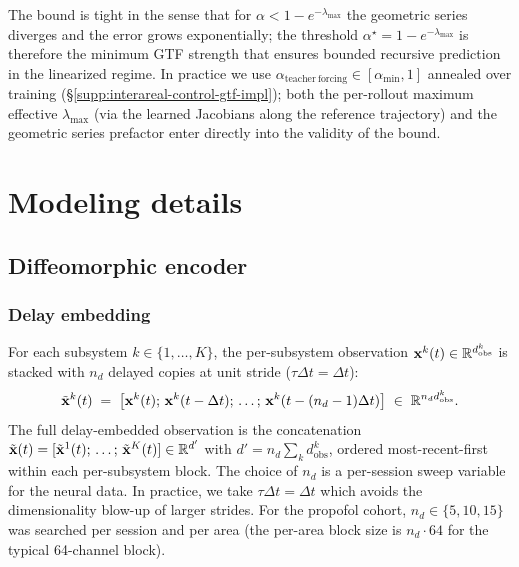\begin{remark}
The bound is tight in the sense that for $\alpha<1-e^{-\lambda_{\max}}$ the geometric series diverges and the error grows exponentially; the threshold $\alpha^{\star}=1-e^{-\lambda_{\max}}$ is therefore the minimum GTF strength that ensures bounded recursive prediction in the linearized regime. In practice we use $\alpha_{\mathrm{teacher\ forcing}}\in[\alpha_{\min},1]$ annealed over training (\S\ref{supp:interareal-control-gtf-impl}); both the per-rollout maximum effective $\lambda_{\max}$ (via the learned Jacobians along the reference trajectory) and the geometric series prefactor enter directly into the validity of the bound.
\end{remark}

\section{Modeling details}\label{supp:interareal-control-modeling}

\subsection{Diffeomorphic encoder}\label{supp:interareal-control-encoder-details}

\subsubsection{Delay embedding}\label{supp:interareal-control-delay-embed}

For each subsystem $k\in\{1,\ldots,K\}$, the per-subsystem observation $\vb{x}^{k}(t)\in\mathbb{R}^{d_{\mathrm{obs}}^{k}}$ is stacked with $n_{d}$ delayed copies at unit stride ($\tau\Delta t=\Delta t$):
\begin{equation}
\tilde{\vb{x}}^{k}(t) \;=\; \bigl[\vb{x}^{k}(t);\,\vb{x}^{k}(t-\Delta t);\,\ldots;\,\vb{x}^{k}(t-(n_{d}-1)\Delta t)\bigr] \;\in\; \mathbb{R}^{n_{d} d_{\mathrm{obs}}^{k}}.
\end{equation}
The full delay-embedded observation is the concatenation $\tilde{\vb{x}}(t)=[\tilde{\vb{x}}^{1}(t);\,\ldots;\,\tilde{\vb{x}}^{K}(t)]\in\mathbb{R}^{d'}$ with $d'=n_{d}\sum_{k}d_{\mathrm{obs}}^{k}$, ordered most-recent-first within each per-subsystem block. The choice of $n_{d}$ is a per-session sweep variable for the neural data. In practice, we take $\tau\Delta t=\Delta t$ which avoids the dimensionality blow-up of larger strides. For the propofol cohort, $n_{d}\in\{5,10,15\}$ was searched per session and per area (the per-area block size is $n_{d}\cdot 64$ for the typical 64-channel block).

